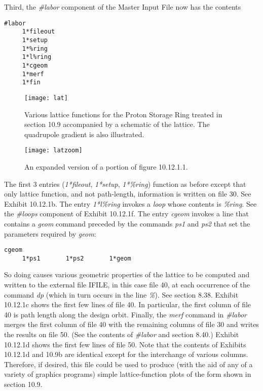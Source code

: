 Third, the {\em \#labor} component of the Master Input File now has the
contents
\begin{footnotesize}
\begin{verbatim}
#labor
	 1*fileout
	 1*setup
	 1*%ring
	 1*l%ring
	 1*cgeom
	 1*merf
	 1*fin
\end{verbatim}
\end{footnotesize}

\newpage
\renewcommand{\thefigure}{\thesubsection.\arabic{figure}}
\begin{figure}[h]
  \centering
  \texttt{[image: lat]}
  \caption{Various lattice functions for the Proton Storage Ring treated
in section 10.9 accompanied by a schematic of the lattice.  The
quadrupole gradient is also illustrated.}
\end{figure}

\newpage
\begin{figure}[h]
  \centering
  \texttt{[image: latzoom]}
  \caption{An expanded version of a portion of figure 10.12.1.1.}
\end{figure}

\newpage
\noindent The first 3 entries ({\em 1*fileout}, {\em 1*setup}, {\em 1*\%ring}) function as
before except that only lattice function, and not path-length, information
is written on file 30.  See Exhibit 10.12.1b.  The entry {\em 1*l\%ring}
invokes a {\em loop} whose contents is {\em \%ring}.  See the {\em
\#loops} component of Exhibit 10.12.1f.  The entry {\em cgeom} invokes a
line that contains a {\em geom} command preceded by the commands {\em ps1}
and {\em ps2} that set the parameters required by {\em geom}:

\begin{footnotesize}
\begin{verbatim}
cgeom
     1*ps1       1*ps2       1*geom
\end{verbatim}
\end{footnotesize}

So doing causes various geometric properties of the lattice to be
computed and written
to the external file IFILE, in this case file 40, at each occurrence of
the command {\em dp} (which in turn occurs in the line {\em \%}).  See
section 8.38.  Exhibit 10.12.1c shows the first few lines of file 40.  In
particular, the first column of file 40 is path length along the design
orbit.  Finally, the {\em merf} command in {\em \#labor} merges the first
column of file 40 with the remaining columns of file 30 and writes the
results on file 50.  (See the contents of {\em \#labor} and section
8.40.)  Exhibit 10.12.1d shows the
first few lines of file 50.  Note that the contents of Exhibits 10.12.1d
and 10.9b are identical except for the interchange of various columns.
Therefore, if desired, this file could be used to produce (with the aid
of any of a variety of graphics programs) simple lattice-function plots of the
form shown in section 10.9.


